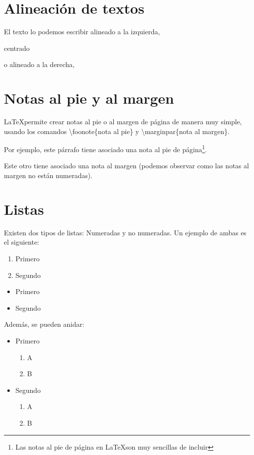 \documentclass[12pt]{book} %
\begin{document}
\section{Alineación de textos}

\begin{flushleft}
El texto lo podemos escribir alineado a la izquierda,	
\end{flushleft}

\begin{center}
centrado
\end{center}

\begin{flushright}
o alineado a la derecha,	
\end{flushright}

\section{Notas al pie y al margen}

\LaTeX permite crear notas al pie o al margen de página de manera muy simple, usando los comandos \textbackslash foonote\{nota al pie\} y  \textbackslash marginpar\{nota al margen\}.

Por ejemplo, este párrafo tiene asociado una nota al pie de página\footnote{Las notas al pie de página en \LaTeX son muy sencillas de incluir}.

Este otro tiene asociado una nota al margen (podemos observar como las notas al margen no están numeradas).

\section{Listas}

Existen dos tipos de listas: Numeradas y no numeradas. Un ejemplo de ambas es el siguiente:

\begin{enumerate}
\item Primero
\item Segundo
\end{enumerate}

\begin{itemize}
\item Primero
\item Segundo
\end{itemize}

Además, se pueden anidar:

\begin{itemize}
\item Primero
	\begin{enumerate}
	\item A
	\item B
	\end{enumerate}
\item Segundo
	\begin{enumerate}
	\item A
	\item B
	\end{enumerate}
\end{itemize}
\end{document}

